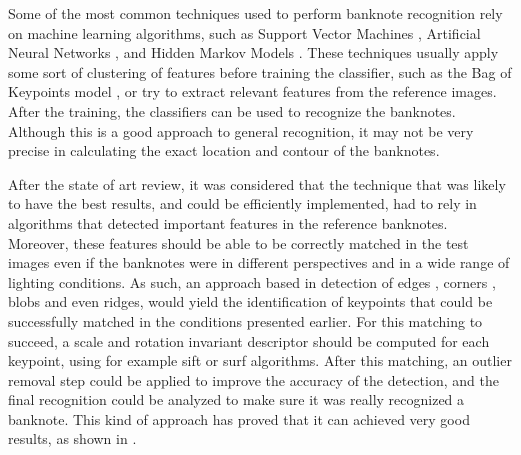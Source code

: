 Some of the most common techniques used to perform banknote recognition rely on machine learning algorithms, such as Support Vector Machines \cite{Yeh2011,Chang2007,Sun2008A}, Artificial Neural Networks \cite{Lee2004,Gai2013,Sun2008B}, and Hidden Markov Models \cite{Hassanpour2009,Shan2009}. These techniques usually apply some sort of clustering of features before training the classifier, such as the Bag of Keypoints model \cite{Csurka2004}, or try to extract relevant features from the reference images. After the training, the classifiers can be used to recognize the banknotes. Although this is a good approach to general recognition, it may not be very precise in calculating the exact location and contour of the banknotes.

After the state of art review, it was considered that the technique that was likely to have the best results, and could be efficiently implemented, had to rely in algorithms that detected important features in the reference banknotes. Moreover, these features should be able to be correctly matched in the test images even if the banknotes were in different perspectives and in a wide range of lighting conditions. As such, an approach based in detection of edges \cite{Shi1994}, corners \cite{Rosten2006}, blobs \cite{Matas2004} and even ridges, would yield the identification of keypoints that could be successfully matched in the conditions presented earlier. For this matching to succeed, a scale and rotation invariant descriptor should be computed for each keypoint, using for example \gls{sift} \cite{Lowe2004} or \gls{surf} \cite{Bay2006} algorithms. After this matching, an outlier removal step could be applied to improve the accuracy of the detection, and the final recognition could be analyzed to make sure it was really recognized a banknote. This kind of approach has proved that it can achieved very good results, as shown in \cite{Hasanuzzaman2011,Hasanuzzaman2012,Toytman2011}.
